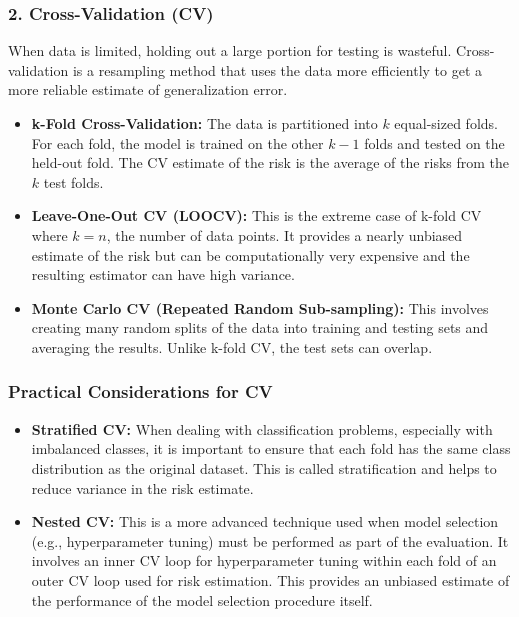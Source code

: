 \documentclass{article}
\begin{document}
\begin{multicols}{2}
	\subsubsection{2. Cross-Validation (CV)}
	When data is limited, holding out a large portion for testing is wasteful. Cross-validation is a resampling method that uses the data more efficiently to get a more reliable estimate of generalization error.

	\begin{itemize}
		\item \textbf{k-Fold Cross-Validation:} The data is partitioned into $k$ equal-sized folds. For each fold, the model is trained on the other $k-1$ folds and tested on the held-out fold. The CV estimate of the risk is the average of the risks from the $k$ test folds.
		\item \textbf{Leave-One-Out CV (LOOCV):} This is the extreme case of k-fold CV where $k=n$, the number of data points. It provides a nearly unbiased estimate of the risk but can be computationally very expensive and the resulting estimator can have high variance.
		\item \textbf{Monte Carlo CV (Repeated Random Sub-sampling):} This involves creating many random splits of the data into training and testing sets and averaging the results. Unlike k-fold CV, the test sets can overlap.
	\end{itemize}

	\subsubsection{Practical Considerations for CV}
	\begin{itemize}
		\item \textbf{Stratified CV:} When dealing with classification problems, especially with imbalanced classes, it is important to ensure that each fold has the same class distribution as the original dataset. This is called stratification and helps to reduce variance in the risk estimate.
		\item \textbf{Nested CV:} This is a more advanced technique used when model selection (e.g., hyperparameter tuning) must be performed as part of the evaluation. It involves an inner CV loop for hyperparameter tuning within each fold of an outer CV loop used for risk estimation. This provides an unbiased estimate of the performance of the model selection procedure itself.
	\end{itemize}



\end{multicols}
\end{document}
